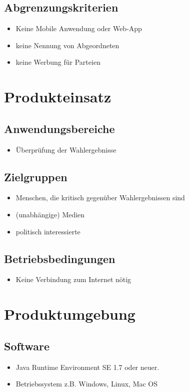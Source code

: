 \documentclass[10pt,a4paper]{article}
\begin{document}
\subsection{Abgrenzungskriterien}
\begin{itemize}
\item Keine Mobile Anwendung oder Web-App
\item keine Nennung von Abgeordneten
\item keine Werbung für Parteien
\end{itemize}


\section{Produkteinsatz}
\subsection{Anwendungsbereiche}
\begin{itemize}
\item Überprüfung der Wahlergebnisse
\end{itemize}


\subsection{Zielgruppen}
\begin{itemize}
\item Menschen, die kritisch gegenüber Wahlergebnissen sind
\item(unabhängige) Medien
\item politisch interessierte
\end{itemize}


\subsection{Betriebsbedingungen}
\begin{itemize}
\item Keine Verbindung zum Internet nötig
\end{itemize}


\section{Produktumgebung}
\subsection{Software}
\begin{itemize}
\item Java Runtime Environment SE 1.7 oder neuer.
\item Betriebssystem z.B. Windows, Linux, Mac OS
\end{itemize}
\end{document}
